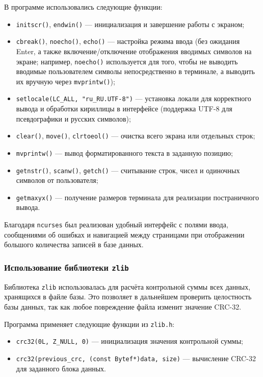 В программе использовались следующие функции:
\begin{itemize}
    \item \texttt{initscr()}, \texttt{endwin()} — инициализация и завершение работы с экраном;
    \item \texttt{cbreak()}, \texttt{noecho()}, \texttt{echo()} — настройка режима ввода (без ожидания Enter, а также включение/отключение отображения вводимых символов на экране; например, \texttt{noecho()} используется для того, чтобы не выводить вводимые пользователем символы непосредственно в терминале, а выводить их вручную через \texttt{mvprintw()});
    \item \texttt{setlocale(LC\_ALL, "ru\_RU.UTF-8")} — установка локали для корректного вывода и обработки кириллицы в интерфейсе (поддержка UTF-8 для псевдографики и русских символов);
    \item \texttt{clear()}, \texttt{move()}, \texttt{clrtoeol()} — очистка всего экрана или отдельных строк;
    \item \texttt{mvprintw()} — вывод форматированного текста в заданную позицию;
    \item \texttt{getnstr()}, \texttt{scanw()}, \texttt{getch()} — считывание строк, чисел и одиночных символов от пользователя;
    \item \texttt{getmaxyx()} — получение размеров терминала для реализации постраничного вывода.
\end{itemize}

Благодаря \texttt{ncurses} был реализован удобный интерфейс с полями ввода, сообщениями об ошибках и навигацией между страницами при отображении большого количества записей в базе данных.

\subsubsection{Использование библиотеки \texttt{zlib}}

Библиотека \texttt{zlib} использовалась для расчёта контрольной суммы всех данных, хранящихся в файле базы. Это позволяет в дальнейшем проверить целостность базы данных, так как любое повреждение файла изменит значение CRC-32.

Программа применяет следующие функции из \texttt{zlib.h}:
\begin{itemize}
    \item \texttt{crc32(0L, Z\_NULL, 0)} — инициализация значения контрольной суммы;
    \item \texttt{crc32(previous\_crc, (const Bytef*)data, size)} — вычисление CRC-32 для заданного блока данных.
\end{itemize}

